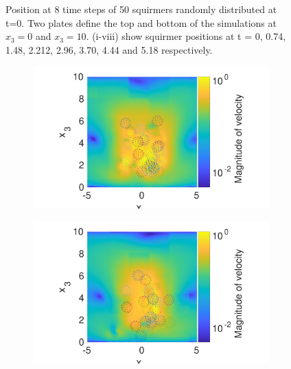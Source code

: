 \begin{figure}
\begin{subfigure}[b]{0.2\textwidth}
    \caption[]{\label{fig:squirmerPosH}}
\end{subfigure}
\label{fig:SquiremerGyroPo}
\caption[Position at 8 time steps of 50 squiremrs randomly distributed at t=0.]{Position at 8 time steps of 50 squirmers randomly distributed at t=0. Two plates define the top and bottom of the simulations at $x_3 = 0$ and  $x_3 = 10$. (i-viii) show squirmer positions at t = 0, 0.74, 1.48, 2.212, 2.96, 3.70, 4.44 and 5.18 respectively.}
\end{figure}

\begin{figure}
\centering
\begin{subfigure}[b]{0.4\textwidth}
    \centering
    \includegraphics[width=\textwidth]{Images/squirmers/Gyro-1.pdf}
    \caption[]{\label{fig:squirmerA}}
\end{subfigure}
\begin{subfigure}[b]{0.4\textwidth}
    \centering
    \includegraphics[width=\textwidth]{Images/squirmers/Gyro-2.pdf}
    \caption[]{\label{fig:squirmerB}}
\end{subfigure}

\end{figure}
